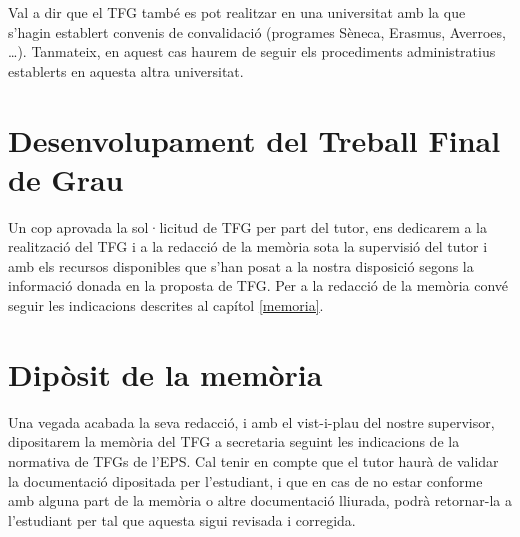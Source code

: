 Val a dir que el \ac{TFG} també es pot realitzar en una universitat amb la que s'hagin establert convenis de convalidació (programes Sèneca, Erasmus, Averroes, \ldots). Tanmateix, en aquest cas haurem de seguir els procediments administratius establerts en aquesta altra universitat.



\section{Desenvolupament del Treball Final de Grau}

Un cop aprovada la sol·licitud de \ac{TFG} per part del tutor, ens dedicarem a la realització del \ac{TFG} i a la redacció de la memòria sota la supervisió del tutor i amb els recursos disponibles que s'han posat a la nostra disposició segons la informació donada en la proposta de \ac{TFG}. Per a la redacció de la memòria convé seguir les indicacions descrites al capítol \ref{memoria}. 

\section{Dipòsit de la memòria}

Una vegada acabada la seva redacció, i amb el vist-i-plau del nostre supervisor, dipositarem la memòria del \ac{TFG} a secretaria seguint les indicacions de la normativa de \acsp{TFG} de l'\ac{EPS}. Cal tenir en compte que el tutor haurà de validar la documentació dipositada per l'estudiant, i que en cas de no estar conforme amb alguna part de la memòria o altre documentació lliurada, podrà retornar-la a l'estudiant per tal que aquesta sigui revisada i corregida. 

